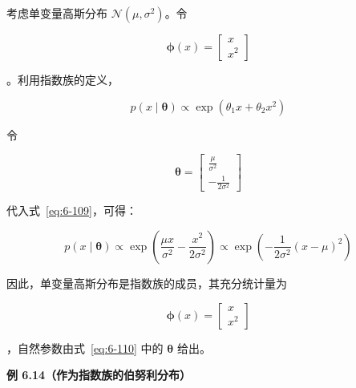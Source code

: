 \begin{notebox}
考虑单变量高斯分布 $ \mathcal{N}(\mu, \sigma^2) $。令

\begin{equation*}
\boldsymbol{\phi}(x) = \begin{bmatrix} x \\ x^2 \end{bmatrix}
\end{equation*}

。利用指数族的定义，

\begin{equation}
p(x \mid \boldsymbol{\theta}) \propto \exp(\theta_1 x + \theta_2 x^2)
\tag{6.109}\label{eq:6-109}
\end{equation}

令

\begin{equation}
\boldsymbol{\theta} = \begin{bmatrix} \frac{\mu}{\sigma^2} \\ -\frac{1}{2\sigma^2} \end{bmatrix}
\tag{6.110}\label{eq:6-110}
\end{equation}

代入式~\eqref{eq:6-109}，可得：

\begin{equation}
p(x \mid \boldsymbol{\theta}) \propto \exp \left( \frac{\mu x}{\sigma^2} - \frac{x^2}{2\sigma^2} \right) \propto \exp \left( -\frac{1}{2\sigma^2} (x - \mu)^2 \right)
\tag{6.111}\label{eq:6-111}
\end{equation}

因此，单变量高斯分布是指数族的成员，其充分统计量为

\begin{equation*}
\boldsymbol{\phi}(x) = \begin{bmatrix} x \\ x^2 \end{bmatrix}
\end{equation*}

，自然参数由式~\eqref{eq:6-110} 中的 $ \boldsymbol{\theta} $ 给出。
\end{notebox}

\begin{notebox}
\textbf{例 6.14（作为指数族的伯努利分布）}
\end{notebox}

